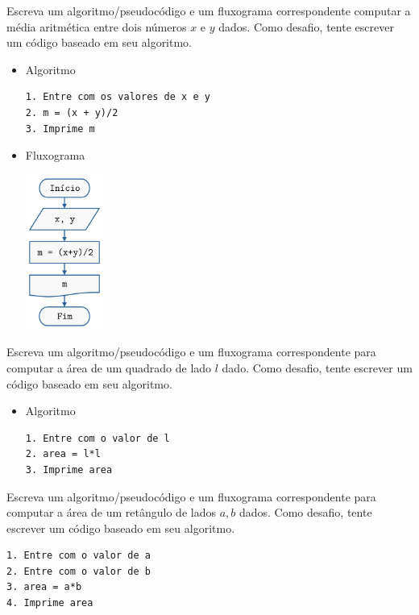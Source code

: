\begin{exer}
  Escreva um algoritmo/pseudocódigo e um fluxograma correspondente computar a média aritmética entre dois números $x$ e $y$ dados. Como desafio, tente escrever um código {\python} baseado em seu algoritmo.
\end{exer}
\begin{resp}
  \begin{itemize}
    \item Algoritmo
    
\begin{verbatim}
1. Entre com os valores de x e y
2. m = (x + y)/2
3. Imprime m
\end{verbatim}

    \item Fluxograma

\includegraphics[width=1in]{./cap_lingua/dados/fig_resp_media/fig.png}

  \end{itemize}
\end{resp}

\begin{exer}
  Escreva um algoritmo/pseudocódigo e um fluxograma correspondente para computar a área de um quadrado de lado $l$ dado. Como desafio, tente escrever um código {\python} baseado em seu algoritmo.
\end{exer}
\begin{resp}
  \begin{itemize}
    \item Algoritmo

\begin{verbatim}
1. Entre com o valor de l
2. area = l*l
3. Imprime area
\end{verbatim}

  \end{itemize}
\end{resp}

\begin{exer}
  Escreva um algoritmo/pseudocódigo e um fluxograma correspondente para computar a área de um retângulo de lados $a, b$ dados. Como desafio, tente escrever um código {\python} baseado em seu algoritmo.
\end{exer}
\begin{resp}

\begin{verbatim}
1. Entre com o valor de a
2. Entre com o valor de b
3. area = a*b
4. Imprime area
\end{verbatim}

\end{resp}


